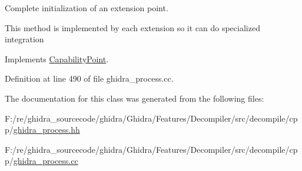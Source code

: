 Complete initialization of an extension point. 

This method is implemented by each extension so it can do specialized integration 

Implements \mbox{\hyperlink{class_capability_point_a493d24125e7e024a9b2d6c2ad4bfbfab}{Capability\+Point}}.



Definition at line 490 of file ghidra\+\_\+process.\+cc.



The documentation for this class was generated from the following files\+:\begin{DoxyCompactItemize}
\item 
F\+:/re/ghidra\+\_\+sourcecode/ghidra/\+Ghidra/\+Features/\+Decompiler/src/decompile/cpp/\mbox{\hyperlink{ghidra__process_8hh}{ghidra\+\_\+process.\+hh}}\item 
F\+:/re/ghidra\+\_\+sourcecode/ghidra/\+Ghidra/\+Features/\+Decompiler/src/decompile/cpp/\mbox{\hyperlink{ghidra__process_8cc}{ghidra\+\_\+process.\+cc}}\end{DoxyCompactItemize}
